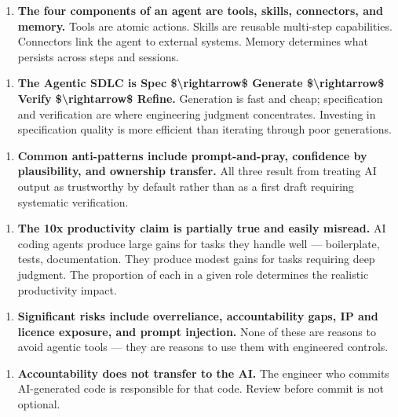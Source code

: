 \documentclass[11pt,a4paper]{book}
\begin{document}
\begin{enumerate}
  \item \textbf{The four components of an agent are tools, skills, connectors, and memory.} Tools are atomic actions. Skills are reusable multi-step capabilities. Connectors link the agent to external systems. Memory determines what persists across steps and sessions.
\end{enumerate}

\begin{enumerate}
  \item \textbf{The Agentic SDLC is Spec \$\textbackslash{}rightarrow\$ Generate \$\textbackslash{}rightarrow\$ Verify \$\textbackslash{}rightarrow\$ Refine.} Generation is fast and cheap; specification and verification are where engineering judgment concentrates. Investing in specification quality is more efficient than iterating through poor generations.
\end{enumerate}

\begin{enumerate}
  \item \textbf{Common anti-patterns include prompt-and-pray, confidence by plausibility, and ownership transfer.} All three result from treating AI output as trustworthy by default rather than as a first draft requiring systematic verification.
\end{enumerate}

\begin{enumerate}
  \item \textbf{The 10x productivity claim is partially true and easily misread.} AI coding agents produce large gains for tasks they handle well --- boilerplate, tests, documentation. They produce modest gains for tasks requiring deep judgment. The proportion of each in a given role determines the realistic productivity impact.
\end{enumerate}

\begin{enumerate}
  \item \textbf{Significant risks include overreliance, accountability gaps, IP and licence exposure, and prompt injection.} None of these are reasons to avoid agentic tools --- they are reasons to use them with engineered controls.
\end{enumerate}

\begin{enumerate}
  \item \textbf{Accountability does not transfer to the AI.} The engineer who commits AI-generated code is responsible for that code. Review before commit is not optional.
\end{enumerate}
\end{document}
